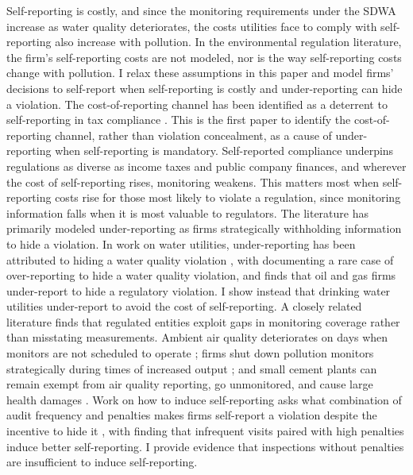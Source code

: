 \documentclass[12pt]{article}
\begin{document}
Self-reporting is costly, and since the monitoring requirements under the SDWA increase as water quality deteriorates, the costs utilities face to comply with self-reporting also increase with pollution. In the environmental regulation literature, the firm's self-reporting costs are not modeled, nor is the way self-reporting costs change with pollution. I relax these assumptions in this paper and model firms' decisions to self-report when self-reporting is costly and under-reporting can hide a violation. The cost-of-reporting channel has been identified as a deterrent to self-reporting in tax compliance \parencite{tazhitdinova2018reducing}. This is the first paper to identify the cost-of-reporting channel, rather than violation concealment, as a cause of under-reporting when self-reporting is mandatory. Self-reported compliance underpins regulations as diverse as income taxes and public company finances, and wherever the cost of self-reporting rises, monitoring weakens. This matters most when self-reporting costs rise for those most likely to violate a regulation, since monitoring information falls when it is most valuable to regulators. The literature has primarily modeled under-reporting as firms strategically withholding information to hide a violation. In work on water utilities, under-reporting has been attributed to hiding a water quality violation \parencite{naylor5537637strategic, andarge2025quantifying, wallsten2008effects}, with \textcite{bennear2009sampling} documenting a rare case of over-reporting to hide a water quality violation, and \textcite{lee2020essays} finds that oil and gas firms under-report to hide a regulatory violation. I show instead that drinking water utilities under-report to avoid the cost of self-reporting. A closely related literature finds that regulated entities exploit gaps in monitoring coverage rather than misstating measurements. Ambient air quality deteriorates on days when monitors are not scheduled to operate \parencite{zou2021unwatched}; firms shut down pollution monitors strategically during times of increased output \parencite{10.1162/rest_a_01477}; and small cement plants can remain exempt from air quality reporting, go unmonitored, and cause large health damages \parencite{zirogiannis2023polluting}. Work on how to induce self-reporting asks what combination of audit frequency and penalties makes firms self-report a violation despite the incentive to hide it \parencite{innes1999remediation, foster2013informational, anton2004incentives}, with \textcite{malik1993self} finding that infrequent visits paired with high penalties induce better self-reporting. I provide evidence that inspections without penalties are insufficient to induce self-reporting. 
\end{document}
